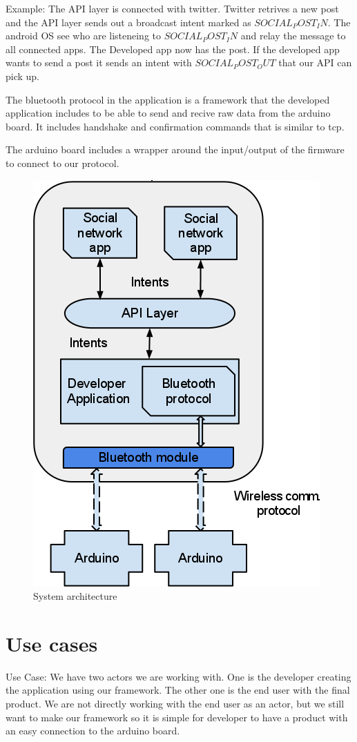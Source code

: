 Example:
The API layer is connected with twitter. Twitter retrives a new post and the API layer sends out a broadcast intent marked as $SOCIAL_POST_IN$. The android OS see who are listeneing to $SOCIAL_POST_IN$ and relay the message to all connected apps. The Developed app now has the post. If the developed app wants to send a post it sends an intent with $SOCIAL_POST_OUT$ that our API can pick up.

The bluetooth protocol in the application is a framework that the developed application includes to be able to send and recive raw data from the arduino board. It includes handshake and confirmation commands that is similar to tcp.

The arduino board includes a wrapper around the input/output of the firmware to connect to our protocol. 
\begin{figure}[hb!]
\centering \includegraphics[scale=0.40]{img/architecture-diagram.png}
\caption{System architecture}
\label{fig:architecture}
\end{figure}

\newpage
\section{Use cases}
Use Case:
We have two actors we are working with. One is the developer creating the application using our framework. The other one is the end user with the final product. We are not directly working with the end user as an actor, but we still want to make our framework so it is simple for developer to have a product with an easy connection to the arduino board.

